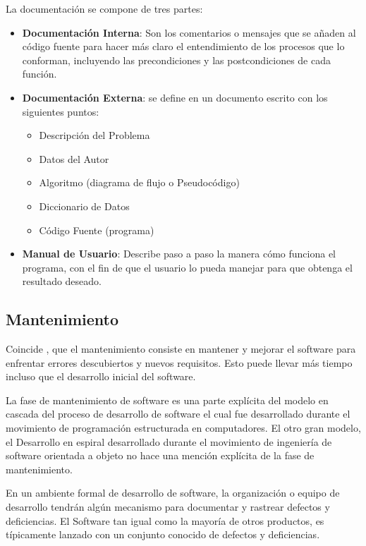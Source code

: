 \documentclass[12pt]{article}
\begin{document}
	\hspace{1.27cm}La documentación se compone de tres partes:

	\begin{itemize}[label=\textbullet, leftmargin=1.27cm]
		\item \textbf{Documentación Interna}: Son los comentarios o mensajes que se añaden al código fuente para hacer más claro el entendimiento de los procesos que lo conforman, incluyendo las precondiciones y las postcondiciones de cada función.
		\item \textbf{Documentación Externa}: se define en un documento escrito con los siguientes puntos:
			\begin{itemize}[label=○]
				\item Descripción del Problema
				\item Datos del Autor
				\item Algoritmo (diagrama de flujo o Pseudocódigo)
				\item Diccionario de Datos
				\item Código Fuente (programa)
			\end{itemize}
		\item \textbf{Manual de Usuario}: Describe paso a paso la manera cómo funciona el programa, con el fin de que el usuario lo pueda manejar para que obtenga el resultado deseado.
	\end{itemize}

	\subsection{Mantenimiento}

	\hspace{1.27cm}Coincide \textcite{maida_metodologias_2015}, que el mantenimiento consiste en mantener y mejorar el software para enfrentar errores descubiertos y nuevos requisitos. Esto puede llevar más tiempo incluso que el desarrollo inicial del software.

	\hspace{1.27cm}La fase de mantenimiento de software es una parte explícita del modelo en cascada del proceso de desarrollo de software el cual fue desarrollado durante el movimiento de programación estructurada en computadores. El otro gran modelo, el Desarrollo en espiral desarrollado durante el movimiento de ingeniería de software orientada a objeto no hace una mención explícita de la fase de mantenimiento.

	\hspace{1.27cm}En un ambiente formal de desarrollo de software, la organización o equipo de desarrollo tendrán algún mecanismo para documentar y rastrear defectos y deficiencias. El Software tan igual como la mayoría de otros productos, es típicamente lanzado con un conjunto conocido de defectos y deficiencias.
\end{document}
